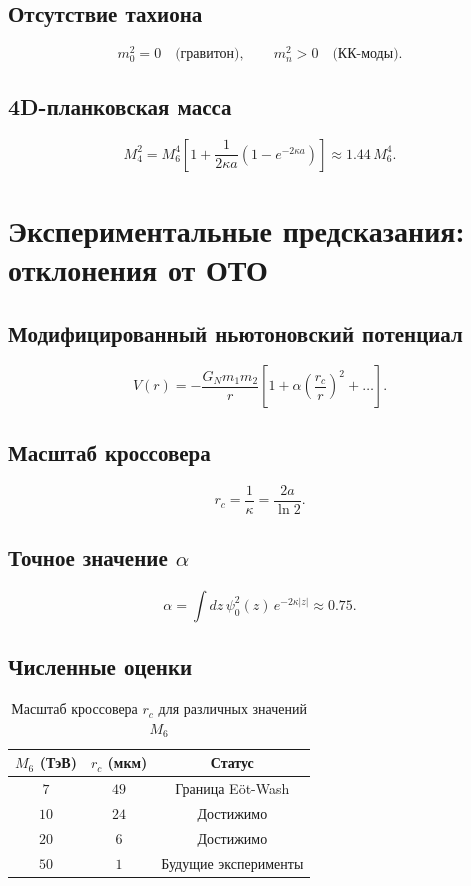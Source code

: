 \documentclass[11pt,letterpaper]{article}
\begin{document}
\subsection{Отсутствие тахиона}
\begin{equation}
m_0^2 = 0 \quad \text{(гравитон)}, \qquad m_n^2 > 0 \quad \text{(КК-моды)}.
\end{equation}

\subsection{4D-планковская масса}
\begin{equation}
M_4^2 = M_6^4 \left[ 1 + \frac{1}{2\kappa a}(1 - e^{-2\kappa a}) \right] \approx 1.44 \, M_6^4 .
\end{equation}

\section{Экспериментальные предсказания: отклонения от ОТО}

\subsection{Модифицированный ньютоновский потенциал}
\begin{equation}
V(r) = -\frac{G_N m_1 m_2}{r} \left[ 1 + \alpha \left(\frac{r_c}{r}\right)^2 + \dots \right].
\end{equation}

\subsection{Масштаб кроссовера}
\begin{equation}
r_c = \frac{1}{\kappa} = \frac{2a}{\ln 2} .
\end{equation}

\subsection{Точное значение $\alpha$}
\begin{equation}
\alpha = \int dz \, \psi_0^2(z) \, e^{-2\kappa |z|} \approx 0.75 .
\end{equation}

\subsection{Численные оценки}
\begin{table}[h!]
\centering
\caption{Масштаб кроссовера $r_c$ для различных значений $M_6$}
\begin{tabular}{ccc}
\toprule
$M_6$ (ТэВ) & $r_c$ (мкм) & Статус \\
\midrule
$7$ & $49$ & Граница Eöt-Wash \\
$10$ & $24$ & Достижимо \\
$20$ & $6$ & Достижимо \\
$50$ & $1$ & Будущие эксперименты \\
\bottomrule
\end{tabular}
\end{table}
\end{document}
